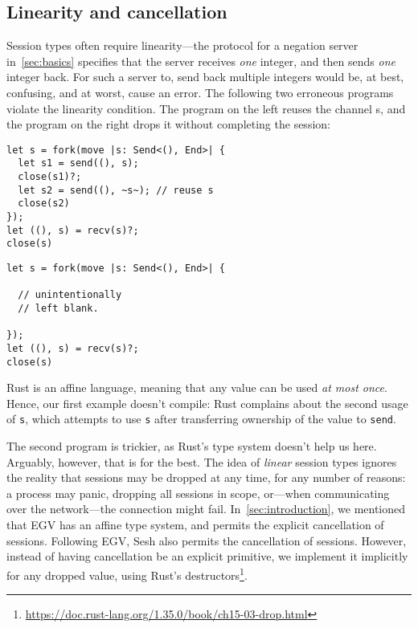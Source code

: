 \documentclass[copyright,creativecommons]{eptcs}
\begin{document}
\subsection{Linearity and cancellation}\label{sec:cancellation}
Session types often require linearity---the protocol for a negation server in~\cref{sec:basics} specifies that the server receives \emph{one} integer, and then sends \emph{one} integer back. For such a server to, \eg send back multiple integers would be, at best, confusing, and at worst, cause an error. The following two erroneous programs violate the linearity condition. The program on the left reuses the channel s, and the program on the right drops it without completing the session:

\vspace{-0.5\baselineskip}
\begin{minipage}[t]{0.5\linewidth}
\begin{lstlisting}
let s = fork(move |s: Send<(), End>| {
  let s1 = send((), s);
  close(s1)?;
  let s2 = send((), ~s~); // reuse s
  close(s2)
});
let ((), s) = recv(s)?;
close(s)
\end{lstlisting}
\end{minipage}%
\begin{minipage}[t]{0.5\linewidth}
\begin{lstlisting}
let s = fork(move |s: Send<(), End>| {

  // unintentionally
  // left blank.

});
let ((), s) = recv(s)?;
close(s)
\end{lstlisting}
\end{minipage}
\vspace{-0.25\baselineskip}

\noindent
Rust is an affine language, meaning that any value can be used \emph{at most once}. Hence, our first example doesn't compile: Rust complains about the second usage of \lstinline{s}, which attempts to use \lstinline{s} after transferring ownership of the value to \lstinline{send}.

The second program is trickier, as Rust's type system doesn't help us here. Arguably, however, that is for the best. The idea of \emph{linear} session types ignores the reality that sessions may be dropped at any time, for any number of reasons: a process may panic, dropping all sessions in scope, or---when communicating over the network---the connection might fail. In~\cref{sec:introduction}, we mentioned that EGV has an affine type system, and permits the explicit cancellation of sessions. Following EGV, Sesh also permits the cancellation of sessions. However, instead of having cancellation be an explicit primitive, we implement it implicitly for any dropped value, using Rust's destructors\footnote{\url{https://doc.rust-lang.org/1.35.0/book/ch15-03-drop.html}}.
\end{document}

